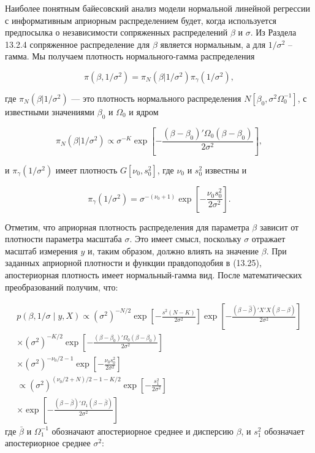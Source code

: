 Наиболее понятным байесовский анализ модели нормальной линейной регрессии с информативным априорным распределением будет, когда используется предпосылка о независимости сопряженных распределений $\beta$ и $\sigma$. Из Раздела 13.2.4 сопряженное распределение для $\beta$ является нормальным, а для $1/\sigma^2$ -- гамма. Мы получаем плотность нормального-гамма распределения

\begin{equation}
\pi(\beta,1/\sigma^2)=\pi_{N}(\beta|1/\sigma^2)\pi_{\gamma}(1/\sigma^2),
\end{equation}

где $\pi_{N}(\beta|1/\sigma^2)$ --- это плотность нормального распределения $N[\beta_0,\sigma^2{\Omega}^{-1}_0]$, с известными значениями $\beta_0$ и $\Omega_0$ и ядром 

\begin{equation}
\pi_{N}(\beta|1/\sigma^2){\propto}\sigma^{-K}\exp[-\dfrac{(\beta-\beta_0)'{\Omega_0}(\beta-\beta_0)}{2\sigma^2}],
\end{equation}

и $\pi_{\gamma}(1/\sigma^2)$ имеет плотность $G[\nu_0,s^2_0]$, где $\nu_0$ и $s^2_0$ известны и 

\begin{equation}
\pi_{\gamma}(1/\sigma^2)=\sigma^{-(\nu_0+1)}\exp\left[-\dfrac{\nu_{0}s^2_0}{2\sigma^2}\right].
\end{equation}

Отметим, что априорная плотность распределения для параметра  $\beta$ зависит от плотности параметра масштаба $\sigma$. Это имеет смысл, поскольку $\sigma$ отражает масштаб измерения $y$ и, таким образом, должно влиять на значение $\beta$. При заданных априорной плотности и  функции правдоподобия в (13.25), апостериорная плотность имеет нормальный-гамма вид. После математических преобразований получим, что:

\begin{multline}
p(\beta,1/\sigma \mid y, X) \propto (\sigma^2)^{-N/2} 
\exp\left[-\frac{s^2(N-K)}{2\sigma^2}\right]
\exp\left[-\frac{(\beta-\hat{\beta})'X'X(\beta-\hat{\beta})}{2\sigma^2}\right] \\
\times (\sigma^2)^{-K/2} 
\exp\left[-\frac{(\beta-\beta_0)'\Omega_0(\beta-\beta_0)}{2\sigma^2}\right] \\
\times (\sigma^2)^{-\nu_0/2-1} 
\exp\left[-\frac{\nu_0 s_0^2}{2\sigma^2}\right]\\
\propto (\sigma^2)^{(\nu_0/2+N)/2-1-K/2} 
\exp\left[-\frac{s_1^2}{2\sigma^2}\right]\\
\times \exp\left[-\frac{(\beta-\bar{\beta})'\Omega_1(\beta-\bar{\beta})}{2\sigma^2}\right]
\end{multline}
где $\bar{\beta}$ и $\Omega_1^{-1}$ обозначают апостериорное среднее и дисперсию $\beta$, и $s_1^2$ обозначает апостериорное среднее $\sigma^2$:


